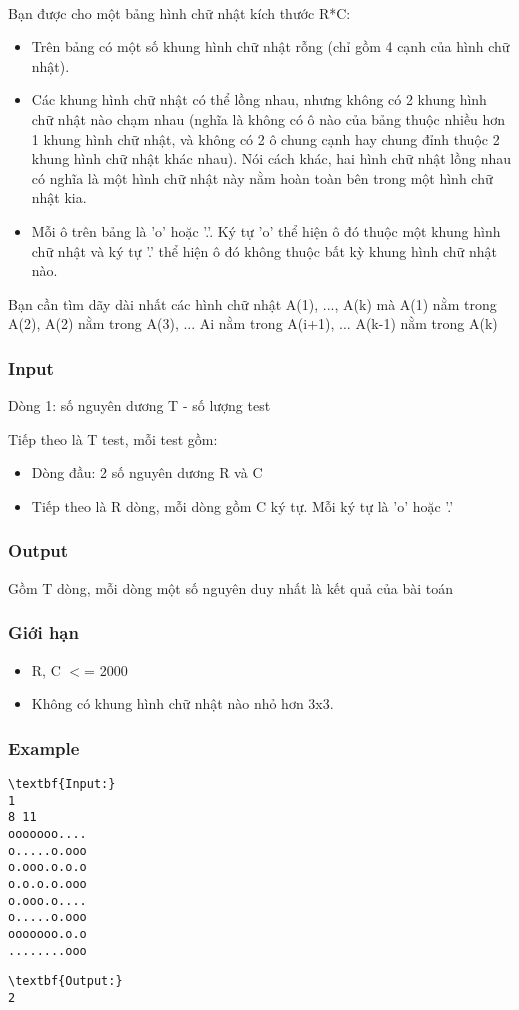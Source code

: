 

 

Bạn được cho một bảng hình chữ nhật kích thước R*C:
\begin{itemize}
	\item Trên bảng có một số khung hình chữ nhật rỗng (chỉ gồm 4 cạnh của hình chữ nhật).
	\item Các khung hình chữ nhật có thể lồng nhau, nhưng không có 2 khung hình chữ nhật nào chạm nhau (nghĩa là không có ô nào của bảng thuộc nhiều hơn 1 khung hình chữ nhật, và không có 2 ô chung cạnh hay chung đỉnh thuộc 2 khung hình chữ nhật khác nhau). Nói cách khác, hai hình chữ nhật lồng nhau có nghĩa là một hình chữ nhật này nằm hoàn toàn bên trong một hình chữ nhật kia.
	\item Mỗi ô trên bảng là 'o' hoặc '.'. Ký tự 'o' thể hiện ô đó thuộc một khung hình chữ nhật và ký tự '.' thể hiện ô đó không thuộc bất kỳ khung hình chữ nhật nào.
\end{itemize}

Bạn cần tìm dãy dài nhất các hình chữ nhật A(1), ..., A(k) mà A(1) nằm trong A(2), A(2) nằm trong A(3), ... Ai nằm trong A(i+1), ... A(k-1) nằm trong A(k)

\subsubsection{Input}

Dòng 1: số nguyên dương T - số lượng test

Tiếp theo là T test, mỗi test gồm:
\begin{itemize}
	\item Dòng đầu: 2 số nguyên dương R và C
	\item Tiếp theo là R dòng, mỗi dòng gồm C ký tự. Mỗi ký tự là 'o' hoặc '.'
\end{itemize}

\subsubsection{Output}

Gồm T dòng, mỗi dòng một số nguyên duy nhất là kết quả của bài toán

\subsubsection{Giới hạn}
\begin{itemize}
	\item R, C $<$= 2000
	\item Không có khung hình chữ nhật nào nhỏ hơn 3x3.
\end{itemize}

\subsubsection{Example}
\begin{verbatim}
\textbf{Input:}
1
8 11
ooooooo....
o.....o.ooo
o.ooo.o.o.o
o.o.o.o.ooo
o.ooo.o....
o.....o.ooo
ooooooo.o.o
........ooo\end{verbatim}
\begin{verbatim}
\textbf{Output:}
2\end{verbatim}